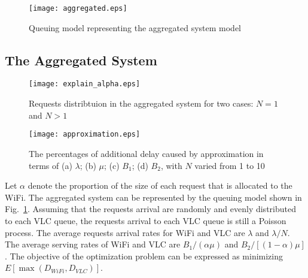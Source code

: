 \documentclass[10pt,journal]{IEEEtran}
\begin{document}
\begin{figure}
\centering
 \texttt{[image: aggregated.eps]}
\caption{Queuing model representing the aggregated system model}
\label{fig_aggregated}
\end{figure}

\subsection{The Aggregated System}

\begin{figure}
\begin{center}
    \texttt{[image: explain\_alpha.eps]}
  \end{center}
\caption{Requests distribtuion in the aggregated system for two cases: $N = 1$ and $N > 1$}
\label{fig_explain_alpha}
\end{figure}

\begin{figure*}
\centering
\texttt{[image: approximation.eps]}
\vspace{-10pt}
\caption{The percentages of additional delay caused by approximation in terms of (a) $\lambda$; (b) $\mu$; (c) $B_{1}$; (d) $B_{2}$, with $N$ varied from 1 to 10}
\label{fig_approximation}
\vspace{-8pt}
\end{figure*}

Let $\alpha$ denote the proportion of the size of each request that is allocated to the WiFi. The aggregated system can be represented by the queuing model shown in Fig.~\ref{fig_aggregated}. Assuming that the requests arrival are randomly and evenly distributed to each VLC queue, the requests arrival to each VLC queue is still a Poisson process. The average requests arrival rates for WiFi and VLC are $\lambda$ and $\lambda/N$. The average serving rates of WiFi and VLC are $B_{1}/(\alpha\mu)$ and $B_{2}/[(1-\alpha)\mu]$. The objective of the optimization problem can be expressed as minimizing $E[\max(D_{WiFi},D_{VLC})]$.
\end{document}
